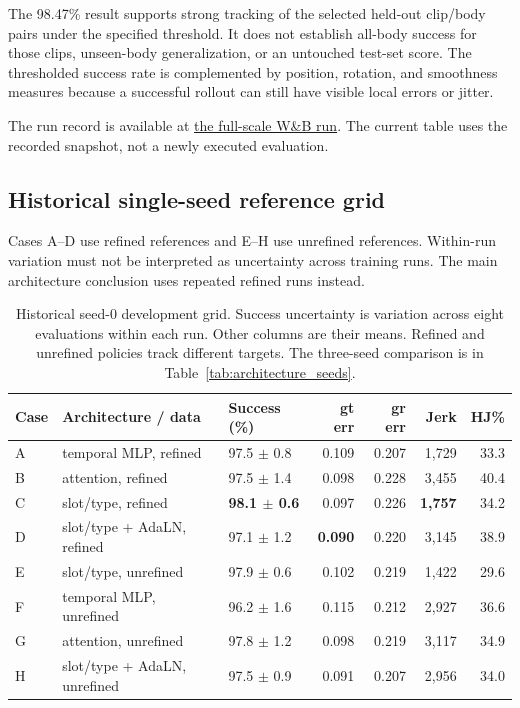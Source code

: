 \documentclass[11pt]{article}
\begin{document}
The 98.47\% result supports strong tracking of the selected held-out
clip/body pairs under the specified threshold. It does not establish
all-body success for those clips, unseen-body generalization, or an untouched
test-set score. The thresholded success rate is complemented by position,
rotation, and smoothness measures because a successful rollout can still
have visible local errors or jitter.

The run record is available at
\href{https://wandb.ai/yugoamaryl/hhi-protomotions/runs/3mvgad6f}
{the full-scale W\&B run}. The current table uses the recorded snapshot,
not a newly executed evaluation.


\subsection{Historical single-seed reference grid}
Cases A--D use refined references and E--H use unrefined references.
Within-run variation must not be interpreted as uncertainty across training
runs. The main architecture conclusion uses repeated refined runs instead.
\begin{table}[t]
\centering
\small
\caption{Historical seed-0 development grid. Success uncertainty is variation across eight evaluations within each run. Other columns are their means. Refined and unrefined policies track different targets. The three-seed comparison is in Table~\ref{tab:architecture_seeds}.}\label{tab:ablation_results}
\begin{tabularx}{\linewidth}{@{}llYrrrr@{}}
\toprule
Case & Architecture / data & Success (\%) & gt err & gr err & Jerk & HJ\% \\
\midrule
A & temporal MLP, refined        & 97.5 $\pm$ 0.8 & 0.109 & 0.207 & 1{,}729 & 33.3 \\
B & attention, refined           & 97.5 $\pm$ 1.4 & 0.098 & 0.228 & 3{,}455 & 40.4 \\
C & slot/type, refined           & \textbf{98.1 $\pm$ 0.6} & 0.097 & 0.226 & \textbf{1{,}757} & 34.2 \\
D & slot/type + AdaLN, refined   & 97.1 $\pm$ 1.2 & \textbf{0.090} & 0.220 & 3{,}145 & 38.9 \\
E & slot/type, unrefined         & 97.9 $\pm$ 0.6 & 0.102 & 0.219 & 1{,}422 & 29.6 \\
F & temporal MLP, unrefined      & 96.2 $\pm$ 1.6 & 0.115 & 0.212 & 2{,}927 & 36.6 \\
G & attention, unrefined         & 97.8 $\pm$ 1.2 & 0.098 & 0.219 & 3{,}117 & 34.9 \\
H & slot/type + AdaLN, unrefined & 97.5 $\pm$ 0.9 & 0.091 & 0.207 & 2{,}956 & 34.0 \\
\bottomrule
\end{tabularx}
\end{table}
\end{document}
